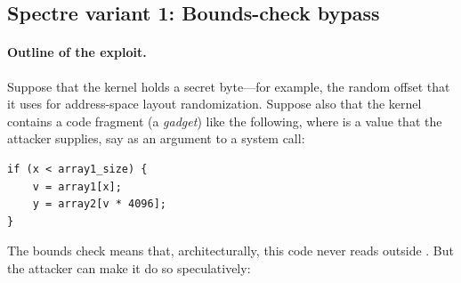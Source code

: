 \subsection{Spectre variant 1: Bounds-check bypass}
\label{sec:sc:v1}

\paragraph{Outline of the exploit.}
Suppose that the kernel holds a secret byte---for example, the random
offset that it uses for address-space layout randomization.
Suppose also that the kernel contains a code fragment
(a \emph{gadget}) like the following, where  is a value that the
attacker supplies, say as an argument to a system call:
\begin{lstlisting}
if (x < array1_size) {
    v = array1[x];
    y = array2[v * 4096];
}
\end{lstlisting}
The bounds check means that, architecturally, this code never reads
outside .
But the attacker can make it do so speculatively:
